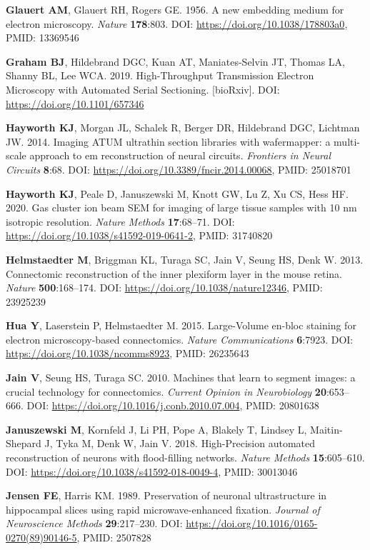 \documentclass{article}
\newenvironment{reflist}{\par\small\setlength{\parindent}{0pt}\everypar{\hangindent=2.2em\hangafter=1}}{\par}
\begin{document}
\begin{reflist}
\textbf{Glauert AM}, Glauert RH, Rogers GE. 1956. A new embedding medium for electron microscopy. \emph{Nature} \textbf{178}:803. DOI: \url{https://doi.org/10.1038/178803a0}, PMID: 13369546

\textbf{Graham BJ}, Hildebrand DGC, Kuan AT, Maniates-Selvin JT, Thomas LA, Shanny BL, Lee WCA. 2019. High-Throughput Transmission Electron Microscopy with Automated Serial Sectioning. [bioRxiv]. DOI: \url{https://doi.org/10.1101/657346}

\textbf{Hayworth KJ}, Morgan JL, Schalek R, Berger DR, Hildebrand DGC, Lichtman JW. 2014. Imaging ATUM ultrathin section libraries with wafermapper: a multi-scale approach to em reconstruction of neural circuits. \emph{Frontiers in Neural Circuits} \textbf{8}:68. DOI: \url{https://doi.org/10.3389/fncir.2014.00068}, PMID: 25018701

\textbf{Hayworth KJ}, Peale D, Januszewski M, Knott GW, Lu Z, Xu CS, Hess HF. 2020. Gas cluster ion beam SEM for imaging of large tissue samples with 10 nm isotropic resolution. \emph{Nature Methods} \textbf{17}:68–71. DOI: \url{https://doi.org/10.1038/s41592-019-0641-2}, PMID: 31740820

\textbf{Helmstaedter M}, Briggman KL, Turaga SC, Jain V, Seung HS, Denk W. 2013. Connectomic reconstruction of the inner plexiform layer in the mouse retina. \emph{Nature} \textbf{500}:168–174. DOI: \url{https://doi.org/10.1038/nature12346}, PMID: 23925239

\textbf{Hua Y}, Laserstein P, Helmstaedter M. 2015. Large-Volume en-bloc staining for electron microscopy-based connectomics. \emph{Nature Communications} \textbf{6}:7923. DOI: \url{https://doi.org/10.1038/ncomms8923}, PMID: 26235643

\textbf{Jain V}, Seung HS, Turaga SC. 2010. Machines that learn to segment images: a crucial technology for connectomics. \emph{Current Opinion in Neurobiology} \textbf{20}:653–666. DOI: \url{https://doi.org/10.1016/j.conb.2010.07.004}, PMID: 20801638

\textbf{Januszewski M}, Kornfeld J, Li PH, Pope A, Blakely T, Lindsey L, Maitin-Shepard J, Tyka M, Denk W, Jain V. 2018. High-Precision automated reconstruction of neurons with flood-filling networks. \emph{Nature Methods} \textbf{15}:605–610. DOI: \url{https://doi.org/10.1038/s41592-018-0049-4}, PMID: 30013046

\textbf{Jensen FE}, Harris KM. 1989. Preservation of neuronal ultrastructure in hippocampal slices using rapid microwave-enhanced fixation. \emph{Journal of Neuroscience Methods} \textbf{29}:217–230. DOI: \url{https://doi.org/10.1016/0165-0270(89)90146-5}, PMID: 2507828


\end{reflist}
\end{document}
